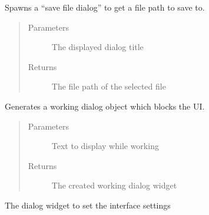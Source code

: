 \documentclass[letterpaper,10pt,english]{sphinxmanual}
\begin{document}
\begin{fulllineitems}
\begin{fulllineitems}
\begin{quote}
\begin{description}
\end{description}\end{quote}

\end{fulllineitems}


\begin{fulllineitems}
\label{\detokenize{src:src.Toolbox.Toolbox.getSaveFileName}}
Spawns a “save file dialog” to get a file path to save to.
\begin{quote}\begin{description}
\item[{Parameters}] \leavevmode
{} \textendash{} The displayed dialog title

\item[{Returns}] \leavevmode
The file path of the selected file

\end{description}\end{quote}

\end{fulllineitems}


\begin{fulllineitems}
\label{\detokenize{src:src.Toolbox.Toolbox.getWorkingDialog}}
Generates a working dialog object which blocks the UI.
\begin{quote}\begin{description}
\item[{Parameters}] \leavevmode
{} \textendash{} Text to display while working

\item[{Returns}] \leavevmode
The created working dialog widget

\end{description}\end{quote}

\end{fulllineitems}


\begin{fulllineitems}
\label{\detokenize{src:src.Toolbox.Toolbox.interfaceDialogWidget}}
The dialog widget to set the interface settings


\end{fulllineitems}
\end{fulllineitems}
\end{document}
